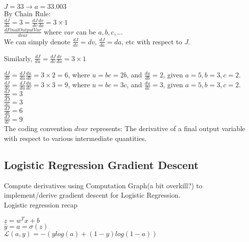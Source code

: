 \documentclass{article}
\begin{document}
$J=33 \rightarrow a=33.003$\\

By Chain Rule:\\

$\frac{dJ}{da} = 3 = \frac{dJ}{dv}\frac{dv}{da} = 3 \times 1$\\

$\frac{dFinalOutputVar}{dvar}$ where $var$ can be $a,b,c,...$\\

We can simply denote $\frac{dJ}{dv} = dv$,
$\frac{dJ}{da} = da$, etc with respect to $J$.

Similarly, $\frac{dJ}{du} = \frac{dJ}{dv}\frac{dv}{du} = 3\times 1$

$\frac{dJ}{db} = \frac{dJ}{du}\frac{du}{db} = 3 \times 2 = 6$, where $u=bc = 2b$, and $\frac{du}{db} = 2$, given $a=5, b=3, c=2$.\\

$\frac{dJ}{dc} = \frac{dJ}{du}\frac{du}{dc} = 3 \times 3 = 9$, where $u=bc = 3c$, and $\frac{du}{dc} = 3$, given $a=5, b=3, c=2$.\\

$\displaystyle \frac{dJ}{da} = 3$\\

$\displaystyle \frac{dJ}{du} = 3$\\

$\displaystyle \frac{dJ}{db} = 6$\\

$\displaystyle \frac{dJ}{dc} = 9$\\

The coding convention $dvar$ represents:
The derivative of a final output variable with respect to various intermediate quantities.

\newpage
\subsection{Logistic Regression Gradient Descent}

Compute derivatives using Computation Graph(a bit overkill?) to implement/derive gradient descent for Logistic Regression.\\

Logistic regression recap

$z = w^{T}x +b$\\

$\hat{y} = a = \sigma(z)$\\

$\mathcal{L}(a,y) = -(ylog(a) + (1-y)log(1-a))$\\
\end{document}
